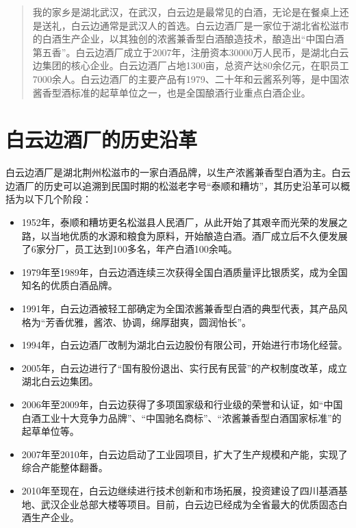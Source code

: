 \documentclass{ctexart}
\begin{document}
    

    \clearpage

    \thispagestyle{empty}

    \begin{abstract}
        我的家乡是湖北武汉，在武汉，白云边是最常见的白酒，无论是在餐桌上还是送礼，白云边通常是武汉人的首选。白云边酒厂是一家位于湖北省松滋市的白酒生产企业，以其独创的浓酱兼香型白酒酿造技术，酿造出“中国白酒第五香”。白云边酒厂成立于2007年，注册资本30000万人民币，是湖北白云边集团的核心企业。白云边酒厂占地1300亩，总资产达80余亿元，在职员工7000余人。白云边酒厂的主要产品有1979、二十年和云酱系列等，是中国浓酱香型酒标准的起草单位之一，也是全国酿酒行业重点白酒企业。
    \end{abstract}

    \clearpage

    \tableofcontents
    
    

    \thispagestyle{empty}

    \clearpage
    \quad
    \thispagestyle{empty}
    \clearpage

    \setcounter{page}{1}

    \section{白云边酒厂的历史沿革}
    白云边酒厂是湖北荆州松滋市的一家白酒品牌，以生产浓酱兼香型白酒为主。白云边酒厂的历史可以追溯到民国时期的松滋老字号“泰顺和糟坊”，其历史沿革可以概括为以下几个阶段：

    \begin{itemize}
    \item 1952年，泰顺和糟坊更名松滋县人民酒厂，从此开始了其艰辛而光荣的发展之路，以当地优质的水源和粮食为原料，开始酿造白酒。酒厂成立后不久便发展了6家分厂，员工达到100多名，年产白酒100余吨。
    \item 1979年至1989年，白云边酒连续三次获得全国白酒质量评比银质奖，成为全国知名的优质白酒品牌。
    \item 1991年，白云边酒被轻工部确定为全国浓酱兼香型白酒的典型代表，其产品风格为“芳香优雅，酱浓、协调，绵厚甜爽，圆润怡长”。
    \item 1994年，白云边酒厂改制为湖北白云边股份有限公司，开始进行市场化经营。
    \item 2005年，白云边进行了“国有股份退出、实行民有民营”的产权制度改革，成立湖北白云边集团。
    \item 2006年至2009年，白云边获得了多项国家级和行业级的荣誉和认证，如“中国白酒工业十大竞争力品牌”、“中国驰名商标”、“浓酱兼香型白酒国家标准”的起草单位等。
    \item 2007年至2010年，白云边启动了工业园项目，扩大了生产规模和产能，实现了综合产能整体翻番。
    \item 2010年至现在，白云边继续进行技术创新和市场拓展，投资建设了四川基酒基地、武汉企业总部大楼等项目。目前，白云边已经成为全省最大的优质固态白酒生产企业。
    \end{itemize} 
\end{document}
